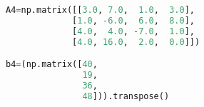 \begin{lstlisting}[language=Python, style=jupycolors]
A4=np.matrix([[3.0, 7.0,  1.0,  3.0],
             [1.0, -6.0,  6.0,  8.0],
             [4.0,  4.0, -7.0,  1.0],
             [4.0, 16.0,  2.0,  0.0]])

b4=(np.matrix([40,
               19,
               36,
               48])).transpose()

\end{lstlisting}